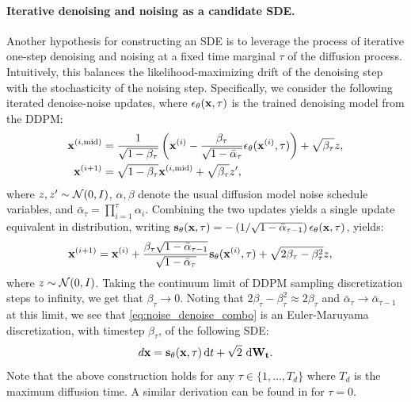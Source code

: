 \paragraph{Iterative denoising and noising as a candidate SDE.} Another hypothesis for constructing an SDE is to leverage the process of iterative one-step denoising and noising at a fixed time marginal $\tau$ of the diffusion process. Intuitively, this balances the likelihood-maximizing drift of the denoising step with the stochasticity of the noising step. Specifically, we consider the following iterated denoise-noise updates, where $\epsilon_\theta(\mathbf{x}, \tau)$ is the trained denoising model from the DDPM:
\begin{align}
    \mathbf{x}^{(i, \text{mid})} &= \frac{1}{\sqrt{1-\beta_\tau}}\left(\mathbf{x}^{(i)} - \frac{\beta_\tau}{\sqrt{1 - \bar{\alpha}_\tau}} \epsilon_\theta(\mathbf{x}^{(i)}, \tau)\right) + \sqrt{\beta_\tau} z, \\
    \mathbf{x}^{(i+1)} &= \sqrt{1 - \beta_\tau} \mathbf{x}^{(i, \text{mid})} + \sqrt{\beta_\tau} z',
\end{align}
where $z, z' \sim \mathcal N(0, I)$, $\alpha, \beta$ denote the usual diffusion model noise schedule variables, and $\bar{\alpha}_\tau = \prod_{i=1}^\tau \alpha_i$. Combining the two updates yields a single update equivalent in distribution, writing $\mathbf{s}_\theta(\mathbf{x}, \tau) = -\left(1 / \sqrt{1-\bar{\alpha}_{\tau-1}}\right)\epsilon_\theta(\mathbf{x}, \tau)$, yields:
\begin{align}
\label{eq:noise_denoise_combo}
\begin{split}
    \mathbf{x}^{(i+1)} &= \mathbf{x}^{(i)} + \frac{\beta_\tau\sqrt{1-\bar{\alpha}_{\tau-1}}}{\sqrt{1-\bar{\alpha}_\tau}} \mathbf{s}_\theta(\mathbf{x}^{(i)}, \tau) + \sqrt{2\beta_\tau - \beta_\tau^2} z,
\end{split}
\end{align}
where $z \sim \mathcal N(0, I)$. Taking the continuum limit of DDPM sampling discretization steps to infinity, we get that $\beta_\tau \to 0$. Noting that $2\beta_\tau - \beta_\tau^2 \approx 2\beta_\tau$ and $\bar{\alpha}_\tau \to \bar{\alpha}_{\tau - 1}$ at this limit, we see that \eqref{eq:noise_denoise_combo} is an Euler-Maruyama discretization, with timestep $\beta_\tau$, of the following SDE:
\begin{equation}\label{eq:latent_sde_def}
    d{\xx} =  \mb{s}_\theta(\xx, \tau)\odif{t} + \sqrt{2} \, \odif{\mathbf{W_t}}.
\end{equation}
Note that the above construction holds for any $\tau \in \{1, \ldots, T_d\}$ where $T_d$ is the maximum diffusion time. A similar derivation can be found in \citet{arts2023two} for $\tau = 0$.

